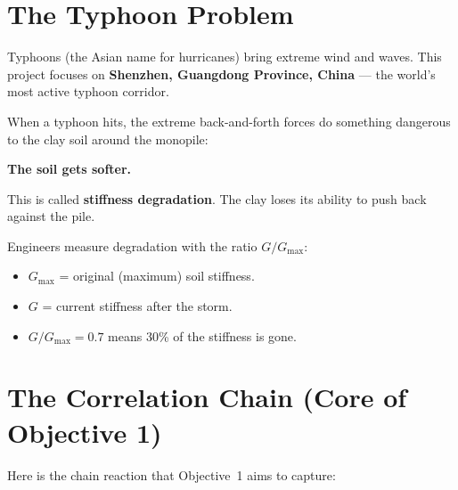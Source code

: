 \documentclass[11pt,a4paper]{article}
\begin{document}
\section{The Typhoon Problem}

Typhoons (the Asian name for hurricanes) bring extreme wind and waves.  This
project focuses on \textbf{Shenzhen, Guangdong Province, China} --- the
world's most active typhoon corridor.

When a typhoon hits, the extreme back-and-forth forces do something dangerous
to the clay soil around the monopile:

\begin{center}
  \textbf{The soil gets softer.}
\end{center}

This is called \textbf{stiffness degradation}.  The clay loses its ability to
push back against the pile.

Engineers measure degradation with the ratio $G/G_{\max}$:
\begin{itemize}[noitemsep]
  \item $G_{\max}$ = original (maximum) soil stiffness.
  \item $G$ = current stiffness after the storm.
  \item $G/G_{\max} = 0.7$ means 30\% of the stiffness is gone.
\end{itemize}

\section{The Correlation Chain (Core of Objective 1)}
\label{sec:chain}

Here is the chain reaction that Objective~1 aims to capture:

\begin{center}
\end{center}
\end{document}
